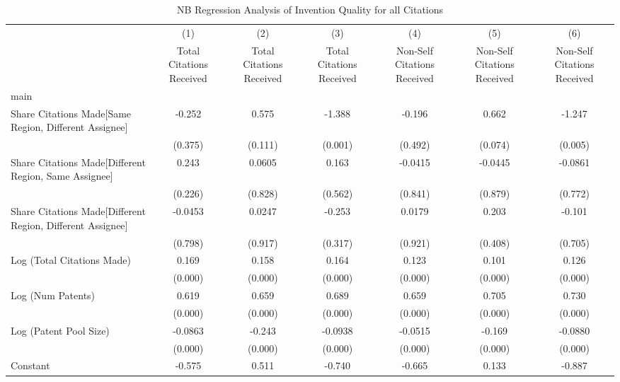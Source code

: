 \begin{table}[htbp]\centering \caption{NB Regression Analysis of Invention Quality for all Citations \label{a.e.o.t.n.model123192021}} \begin{tabular}{l*{6}{c}} \hline\hline
                &\multicolumn{1}{c}{(1)}&\multicolumn{1}{c}{(2)}&\multicolumn{1}{c}{(3)}&\multicolumn{1}{c}{(4)}&\multicolumn{1}{c}{(5)}&\multicolumn{1}{c}{(6)}\\
                &\multicolumn{1}{c}{Total Citations Received}&\multicolumn{1}{c}{Total Citations Received}&\multicolumn{1}{c}{Total Citations Received}&\multicolumn{1}{c}{Non-Self Citations Received}&\multicolumn{1}{c}{Non-Self Citations Received}&\multicolumn{1}{c}{Non-Self Citations Received}\\
\hline
main            &         &         &         &         &         &         \\
Share Citations Made[Same Region, Different Assignee]&   -0.252&    0.575&   -1.388&   -0.196&    0.662&   -1.247\\
                &  (0.375)&  (0.111)&  (0.001)&  (0.492)&  (0.074)&  (0.005)\\
Share Citations Made[Different Region, Same Assignee]&    0.243&   0.0605&    0.163&  -0.0415&  -0.0445&  -0.0861\\
                &  (0.226)&  (0.828)&  (0.562)&  (0.841)&  (0.879)&  (0.772)\\
Share Citations Made[Different Region, Different Assignee]&  -0.0453&   0.0247&   -0.253&   0.0179&    0.203&   -0.101\\
                &  (0.798)&  (0.917)&  (0.317)&  (0.921)&  (0.408)&  (0.705)\\
Log (Total Citations Made)&    0.169&    0.158&    0.164&    0.123&    0.101&    0.126\\
                &  (0.000)&  (0.000)&  (0.000)&  (0.000)&  (0.000)&  (0.000)\\
Log (Num Patents)&    0.619&    0.659&    0.689&    0.659&    0.705&    0.730\\
                &  (0.000)&  (0.000)&  (0.000)&  (0.000)&  (0.000)&  (0.000)\\
Log (Patent Pool Size)&  -0.0863&   -0.243&  -0.0938&  -0.0515&   -0.169&  -0.0880\\
                &  (0.000)&  (0.000)&  (0.000)&  (0.000)&  (0.000)&  (0.000)\\
Constant        &   -0.575&    0.511&   -0.740&   -0.665&    0.133&   -0.887\\

\end{tabular}
\end{table}
